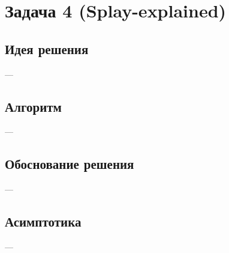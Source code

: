 \section{Задача 4 (Splay-explained)}
\subsection{Идея решения}
---

\subsection{Алгоритм}
---

\subsection{Обоснование решения}
---

\subsection{Асимптотика}
---
